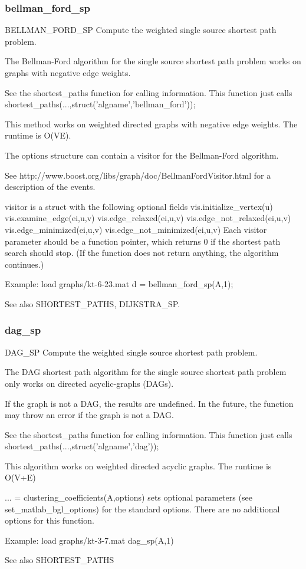 \subsubsection*{bellman\_ford\_sp}
\begin{mcode}
  BELLMAN_FORD_SP Compute the weighted single source shortest path problem.
 
  The Bellman-Ford algorithm for the single source shortest path problem
  works on graphs with negative edge weights.  
 
  See the shortest_paths function for calling information.  This function 
  just calls shortest_paths(...,struct('algname','bellman_ford'));
 
  This method works on weighted directed graphs with negative edge weights.
  The runtime is O(VE).
 
  The options structure can contain a visitor for the Bellman-Ford 
  algorithm.  
 
  See http://www.boost.org/libs/graph/doc/BellmanFordVisitor.html for a 
  description of the events.
  
  visitor is a struct with the following optional fields
     vis.initialize_vertex(u)
     vis.examine_edge(ei,u,v)
     vis.edge_relaxed(ei,u,v)
     vis.edge_not_relaxed(ei,u,v)
     vis.edge_minimized(ei,u,v)
     vis.edge_not_minimized(ei,u,v)
  Each visitor parameter should be a function pointer, which returns 0
  if the shortest path search should stop.  (If the function does not 
  return anything, the algorithm continues.)
 
  Example:
     load graphs/kt-6-23.mat
     d = bellman_ford_sp(A,1);
 
  See also SHORTEST_PATHS, DIJKSTRA_SP.
\end{mcode}
\newpage
\subsubsection*{dag\_sp}
\begin{mcode}
  DAG_SP Compute the weighted single source shortest path problem.
 
  The DAG shortest path algorithm for the single source shortest path
  problem only works on directed acyclic-graphs (DAGs).  
 
  If the graph is not a DAG, the results are undefined.  In the future, the
  function may throw an error if the graph is not a DAG.
 
  See the shortest_paths function for calling information.  This function 
  just calls shortest_paths(...,struct('algname','dag'));
 
  This algorithm works on weighted directed acyclic graphs.
  The runtime is O(V+E)
 
  ... = clustering_coefficients(A,options) sets optional parameters (see 
  set_matlab_bgl_options) for the standard options.
     There are no additional options for this function.
 
  Example:
     load graphs/kt-3-7.mat
     dag_sp(A,1)
 
  See also SHORTEST_PATHS
\end{mcode}
\newpage
